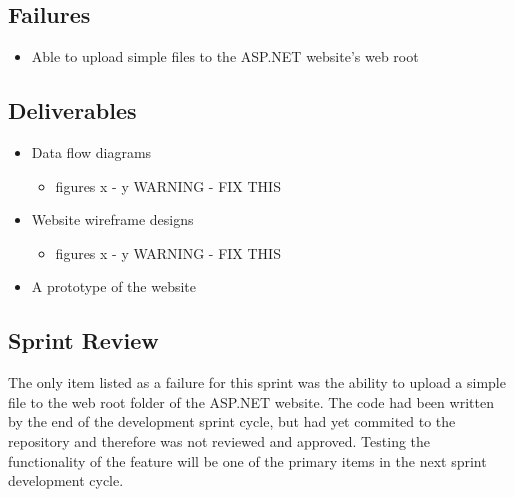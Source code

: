     \subsection{Failures}
    \label{sec:Sprint1_failures}
        \begin{itemize} 
            \item Able to upload simple files to the ASP.NET website's web root
        \end{itemize}

    \subsection{Deliverables}
    \label{sec:Sprint1_deliverables}
    \begin{itemize}
        \item Data flow diagrams
            \begin{itemize} \item figures x - y WARNING - FIX THIS \end{itemize} %
        \item Website wireframe designs
            \begin{itemize} \item figures x - y WARNING - FIX THIS \end{itemize} %
        \item A prototype of the website
    \end{itemize}

    \subsection{Sprint Review}
    \label{sec:Sprint1_review}
        \hspace{7mm}
        The only item listed as a failure for this sprint was the ability to upload a simple file
        to the web root folder of the ASP.NET website.  The code had been written by the end of the 
        development sprint cycle, but had yet commited to the repository and therefore was not 
        reviewed and approved.  Testing the functionality of the feature will be one of the primary 
        items in the next sprint development cycle.

